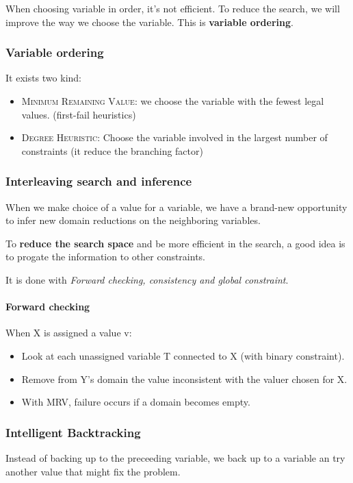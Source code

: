 When  choosing variable  in order,  it's  not efficient.  To reduce  the
search,  we  will improve  the  way  we  choose  the variable.  This  is
\textbf{variable ordering}.

\subsubsection{Variable ordering}
It exists two kind:
\begin{itemize}
    \item \textsc{Minimum Remaining Value}: we choose the variable with the fewest legal values. (first-fail heuristics)
    \item \textsc{Degree Heuristic}: Choose the variable involved in the largest number of constraints (it reduce the branching factor)
\end{itemize}

\subsubsection{Interleaving search and inference} 
When we make choice of a value for a variable, we have a brand-new opportunity to infer new
domain reductions on the neighboring variables.

To \textbf{reduce the search  space} and be more efficient in  the search, a good
idea is to progate the information to other constraints. 

It  is  done  with  \textit{Forward  checking,  consistency  and  global
constraint}.

\paragraph{\textbf{Forward checking} }
When X is assigned a value v:
\begin{itemize}
	\item Look at each unassigned variable T connected to X (with binary constraint).
	\item Remove from Y's domain the value inconsistent with the valuer chosen for X.
	\item With MRV, failure occurs if a domain becomes empty.
\end{itemize}

\subsubsection{Intelligent Backtracking}  Instead of  backing up  to the
preceeding variable, we back up to  a variable an try another value that
might fix the problem.

